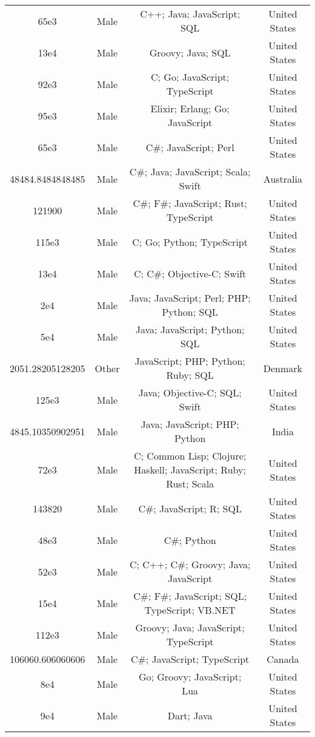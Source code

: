 \begin{center}
\begin{tabular}{ |c|c|c|c| }
65e3  &  Male  &  C++; Java; JavaScript; SQL  &  United States  \\ 
13e4  &  Male  &  Groovy; Java; SQL  &  United States  \\ 
92e3  &  Male  &  C; Go; JavaScript; TypeScript  &  United States  \\ 
95e3  &  Male  &  Elixir; Erlang; Go; JavaScript  &  United States  \\ 
65e3  &  Male  &  C\#; JavaScript; Perl  &  United States  \\ 
48484.8484848485  &  Male  &  C\#; Java; JavaScript; Scala; Swift  &  Australia  \\ 
121900  &  Male  &  C\#; F\#; JavaScript; Rust; TypeScript  &  United States  \\ 
115e3  &  Male  &  C; Go; Python; TypeScript  &  United States  \\ 
13e4  &  Male  &  C; C\#; Objective-C; Swift  &  United States  \\ 
2e4  &  Male  &  Java; JavaScript; Perl; PHP; Python; SQL  &  United States  \\ 
5e4  &  Male  &  Java; JavaScript; Python; SQL  &  United States  \\ 
2051.28205128205  &  Other  &  JavaScript; PHP; Python; Ruby; SQL  &  Denmark  \\ 
125e3  &  Male  &  Java; Objective-C; SQL; Swift  &  United States  \\ 
4845.10350902951  &  Male  &  Java; JavaScript; PHP; Python  &  India  \\ 
72e3  &  Male  &  C; Common Lisp; Clojure; Haskell; JavaScript; Ruby; Rust; Scala  &  United States  \\ 
143820  &  Male  &  C\#; JavaScript; R; SQL  &  United States  \\ 
48e3  &  Male  &  C\#; Python  &  United States  \\ 
52e3  &  Male  &  C; C++; C\#; Groovy; Java; JavaScript  &  United States  \\ 
15e4  &  Male  &  C\#; F\#; JavaScript; SQL; TypeScript; VB.NET  &  United States  \\ 
112e3  &  Male  &  Groovy; Java; JavaScript; TypeScript  &  United States  \\ 
106060.606060606  &  Male  &  C\#; JavaScript; TypeScript  &  Canada  \\ 
8e4  &  Male  &  Go; Groovy; JavaScript; Lua  &  United States  \\ 
9e4  &  Male  &  Dart; Java  &  United States  \\ 

\end{tabular}
\end{center}
